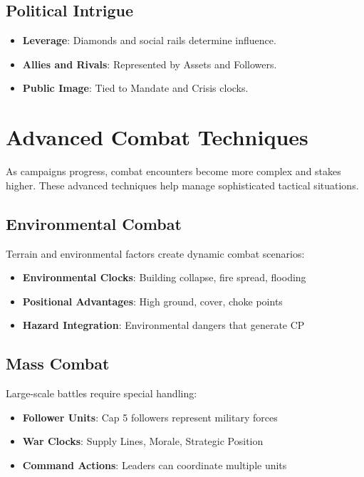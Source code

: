 \subsection*{Political Intrigue}

\begin{itemize}
    \item \textbf{Leverage}: Diamonds and social rails determine influence.
    \item \textbf{Allies and Rivals}: Represented by Assets and Followers.
    \item \textbf{Public Image}: Tied to Mandate and Crisis clocks.
\end{itemize}

\section*{Advanced Combat Techniques}

As campaigns progress, combat encounters become more complex and stakes higher. These advanced techniques help manage sophisticated tactical situations.

\subsection*{Environmental Combat}

Terrain and environmental factors create dynamic combat scenarios:

\begin{itemize}
    \item \textbf{Environmental Clocks}: Building collapse, fire spread, flooding
    \item \textbf{Positional Advantages}: High ground, cover, choke points
    \item \textbf{Hazard Integration}: Environmental dangers that generate CP
\end{itemize}

\subsection*{Mass Combat}

Large-scale battles require special handling:

\begin{itemize}
    \item \textbf{Follower Units}: Cap 5 followers represent military forces
    \item \textbf{War Clocks}: Supply Lines, Morale, Strategic Position
    \item \textbf{Command Actions}: Leaders can coordinate multiple units
\end{itemize}

